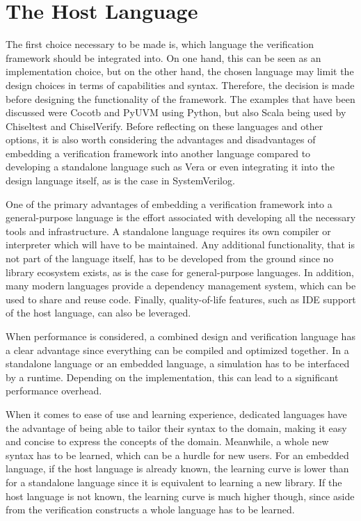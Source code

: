 \section{The Host Language} %

The first choice necessary to be made is, which language the verification framework should be integrated into. On one hand,
this can be seen as an implementation choice, but on the other hand, the chosen language may limit the design choices
in terms of capabilities and syntax. Therefore, the decision is made before designing the functionality of the
framework. The examples
that have been discussed were Cocotb and PyUVM using Python, but also Scala being used by Chiseltest and
ChiselVerify. Before reflecting on these languages and other options, it is also worth considering the advantages
and disadvantages of embedding a verification framework into another language compared to developing a standalone
language such as Vera or even integrating it into the design language itself, as is the case in SystemVerilog.

One of the primary advantages of embedding a verification framework into a general-purpose language is the effort
associated with developing all the necessary tools and infrastructure. A standalone language requires its own
compiler or interpreter which will have to be maintained. Any additional functionality, that is not part of the
language itself, has to be developed from the ground since no library ecosystem exists, as is the case for
general-purpose languages. In addition, many modern languages provide a dependency management system, which can be
used to share and reuse code. Finally, quality-of-life features, such as IDE support of the host language, can
also be leveraged.

When performance is considered, a combined design and verification language has a clear advantage since everything
can be compiled and optimized together. In a standalone language or an embedded language, a simulation has to be
interfaced by a runtime. Depending on the implementation, this can lead to a significant performance overhead.

When it comes to ease of use and learning experience, dedicated languages have the advantage of being able to
tailor their syntax to the domain, making it easy and concise to express the concepts of the domain. Meanwhile, a whole new syntax has to be learned, which can be a hurdle for new users. For an embedded language, if the
host language is already known, the learning curve is lower than for a standalone language since it is equivalent to
learning a new library. If the host language is not known, the learning curve is much higher though, since aside from
the verification constructs a whole language has to be learned.

